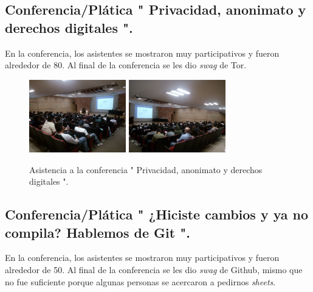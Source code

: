 \documentclass[a4paper,11pt]{article}                 %
\begin{document}
  \subsection{Conferencia/Plática " Privacidad, anonimato y derechos digitales ".}     
  En la conferencia, los asistentes se mostraron muy participativos y fueron alrededor de 80. Al final de la conferencia se les dio \textit{swag} de Tor.
             \begin{figure}[H]
    \begin{center}
      \includegraphics[width=0.375\textwidth]{images/tor-02}
      \includegraphics[width=0.375\textwidth]{images/tor-01}
      \caption{Asistencia a la conferencia  " Privacidad, anonimato y derechos digitales ".}
      \label{fig:tor}
    \end{center}
  \end{figure}  
  
  
  \subsection{Conferencia/Plática " ¿Hiciste cambios y ya no compila? Hablemos de Git ".} 
    En la conferencia, los asistentes se mostraron muy participativos y fueron alrededor de 50. Al final de la conferencia se les dio \textit{swag} de Github, mismo que no fue suficiente porque algunas personas se acercaron a pedirnos \textit{sheets}.
  
\end{document}
